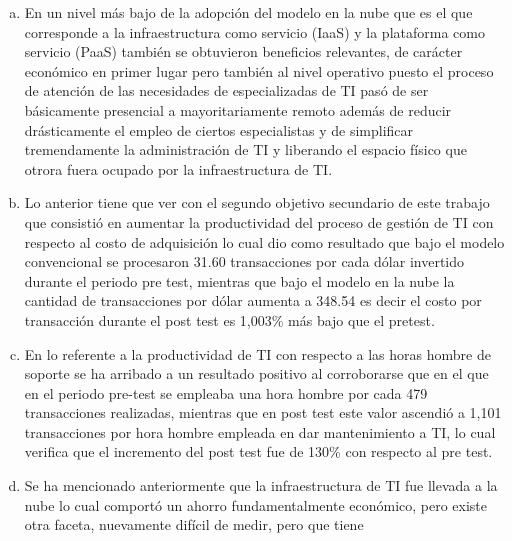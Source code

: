 \begin{enumerate}[a.]
          pasar a ser clientes de la empresa, la disponibilidad de m\'ultiples
          an\'alisis provistos de manera autom\'atica por la aplicaci\'on y algo
          muy importante, la adopci\'on de las mejores pr\'acticas para el proceso
          de ventas las cuales vienen ya incorporadas en la soluci\'on adoptada.
    \item En un nivel m\'as bajo de la adopci\'on del modelo en la nube que es
          el que corresponde a la infraestructura como servicio (IaaS) y la
          plataforma como servicio (PaaS) tambi\'en se obtuvieron beneficios
          relevantes, de car\'acter econ\'omico en primer lugar pero tambi\'en
          al nivel operativo puesto el proceso de atenci\'on de las necesidades
          de especializadas de TI pas\'o de ser b\'asicamente presencial a
          mayoritariamente remoto adem\'as de reducir dr\'asticamente el empleo
          de ciertos especialistas y de simplificar tremendamente la administraci\'on
          de TI y liberando el espacio f\'isico que otrora fuera ocupado por la
          infraestructura de TI.
    \item Lo anterior tiene que ver con el segundo objetivo secundario de este
          trabajo que consisti\'o en aumentar la productividad del proceso de
          gesti\'on de TI con respecto al costo de adquisici\'on lo cual dio como
          resultado que bajo el modelo convencional se procesaron 31.60 transacciones
          por cada d\'olar invertido durante el periodo pre test, mientras que
          bajo el modelo en la nube la cantidad de transacciones por d\'olar
          aumenta a 348.54 es decir el costo por transacci\'on durante el post
          test es 1,003\% m\'as bajo que el pretest.
    \item En lo referente a la productividad de TI con respecto a las horas
          hombre de soporte se ha arribado a un resultado positivo al corroborarse
          que en el que en el periodo pre-test se empleaba una hora hombre por
          cada 479 transacciones realizadas, mientras que en post test este valor
          ascendi\'o a 1,101 transacciones por hora hombre empleada en dar
          mantenimiento a TI, lo cual verifica que el incremento del post test
          fue de 130\% con respecto al pre test.
    \item Se ha mencionado anteriormente que la infraestructura de TI fue llevada
          a la nube lo cual comport\'o un ahorro fundamentalmente econ\'omico,
          pero existe otra faceta, nuevamente dif\'icil de medir, pero que tiene

\end{enumerate}
